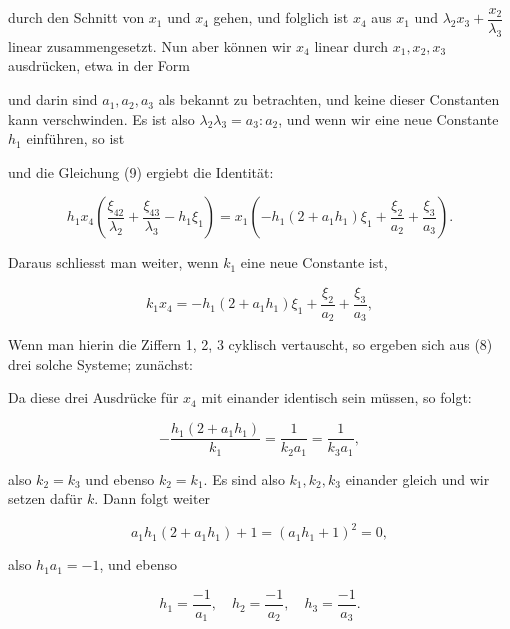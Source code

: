 durch den Schnitt von $x_1$ und $x_4$ gehen, und folglich ist $x_4$ aus $x_1$ und $\lambda_2 x_3 + \dfrac{x_2}{\lambda_3}$ linear zusammengesetzt. Nun aber können wir $x_4$ linear durch $x_1, x_2, x_3$ ausdrücken, etwa in der Form


und darin sind $a_1, a_2, a_3$ als bekannt zu betrachten, und keine dieser Constanten kann verschwinden. Es ist also $\lambda_2\lambda_3 = a_3 : a_2$, und wenn wir eine neue Constante $h_1$ einführen, so ist


und die Gleichung (9) ergiebt die Identität:

\[
h_1 x_4\left(\frac{\xi_{42}}{\lambda_2} + \frac{\xi_{43}}{\lambda_3} - h_1\xi_1\right) = x_1\left(-h_1(2+a_1h_1)\xi_1 + \frac{\xi_2}{a_2} + \frac{\xi_3}{a_3}\right).
\]

Daraus schliesst man weiter, wenn $k_1$ eine neue Constante ist,

\[
k_1 x_4 = -h_1(2+a_1h_1)\xi_1 + \frac{\xi_2}{a_2} + \frac{\xi_3}{a_3},
\]


Wenn man hierin die Ziffern 1, 2, 3 cyklisch vertauscht, so ergeben sich aus (8) drei solche Systeme; zunächst:


Da diese drei Ausdrücke für $x_4$ mit einander identisch sein müssen, so folgt:

\[
-\frac{h_1(2+a_1h_1)}{k_1} = \frac{1}{k_2 a_1} = \frac{1}{k_3 a_1},
\]

also $k_2 = k_3$ und ebenso $k_2 = k_1$. Es sind also $k_1, k_2, k_3$ einander gleich und wir setzen dafür $k$. Dann folgt weiter

\[
a_1 h_1(2+a_1h_1) + 1 = (a_1h_1+1)^2 = 0,
\]

also $h_1 a_1 = -1$, und ebenso

\[
h_1 = \frac{-1}{a_1},\quad h_2 = \frac{-1}{a_2},\quad h_3 = \frac{-1}{a_3}.
\]
